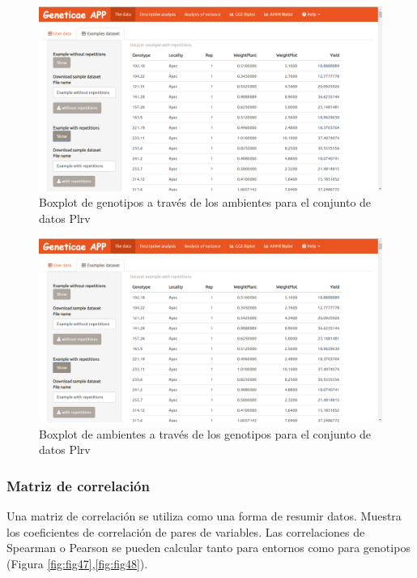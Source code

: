 \begin{figure}[H]
	\begin{center}
		\includegraphics[width=17cm]{./Graficos/Exampledatasets_withrep.png}
	\end{center}
	\caption{Boxplot de genotipos a través de los ambientes para el conjunto de datos Plrv}
	\label{fig:fig45}
\end{figure}


\begin{figure}[H]
	\begin{center}
		\includegraphics[width=17cm]{./Graficos/Exampledatasets_withrep.png}
	\end{center}
	\caption{Boxplot de ambientes a través de los genotipos para el conjunto de datos Plrv}
	\label{fig:fig46}
\end{figure}

\subsubsection{Matriz de correlación}
Una matriz de correlación se utiliza como una forma de resumir datos. Muestra los coeficientes de correlación de pares de variables. Las correlaciones de Spearman o Pearson se pueden calcular tanto para entornos como para genotipos (Figura \ref{fig:fig47},\ref{fig:fig48}).


